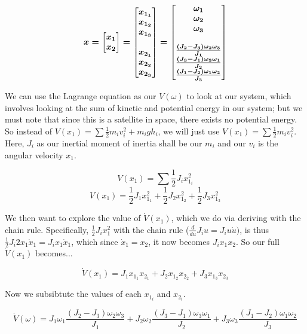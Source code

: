 \documentclass{article}
\begin{document}
\[ \boldmath{x} = \begin{bmatrix}
    x_1 \\ x_2
\end{bmatrix} = \begin{bmatrix}
    x_{1_1} \\
    x_{1_2} \\ 
    x_{1_3} \\
    \\
    x_{2_1} \\
    x_{2_2} \\
    x_{2_3} 
\end{bmatrix} =
\begin{bmatrix}
    \omega_1 \\
    \omega_2 \\
    \omega_3 \\
    \\ 
    \frac{(J_2 - J_3)\omega_2 \omega_3}{J_1} \\
    \frac{(J_3 - J_1)\omega_3 \omega_1}{J_2} \\
    \frac{(J_1 - J_2)\omega_1 \omega_2}{J_3}
\end{bmatrix}\]

We can use the Lagrange equation as our $V(\omega)$ to look at our system, which involves looking at the sum of kinetic and potential energy in our system; but we must note that since this is a satellite in space, there exists no potential energy. So instead of  $V(x_1) = \sum{\frac{1}{2}m_iv_i^2+m_igh_i}$, we will just use $V(x_1) = \sum{\frac{1}{2}m_iv_i^2}$. Here, $J_i$ as our inertial moment of inertia shall be our $m_i$ and our $v_i$ is the angular velocity $x_1$.

\[ V(x_1) = \sum{\frac{1}{2} J_i x_{1_i}^2} \]
\[ V(x_1) = \frac{1}{2} J_1 x_{1_1}^2 + \frac{1}{2} J_2 x_{1_2}^2 + \frac{1}{2} J_3 x_{1_3}^2 \]

We then want to explore the value of $\dot{V}(x_1)$, which we do via deriving with the chain rule. Specifically, $\frac{1}{2}J_i x_1^2$ with the chain rule ($\frac{d}{du}J_i u = J_i u \dot{u})$, is thus $\frac{1}{2} J_i 2 x_1 \dot{x}_1 = J_i x_1 \dot{x}_1$, which since $\dot{x}_1 = x_2$, it now becomes $J_i x_1 x_2$. So our full $\dot{V}(x_1)$ becomes...

\[ \dot{V}(x_1) = J_1 x_{1_1} x_{2_1} + J_2 x_{1_2} x_{2_2} + J_3 x_{1_3} x_{2_3}\]

Now we subsibtute the values of each $x_{1_i}$ and $x_{2_i}$.

\[ \dot{V}(\omega) = J_1 \omega_1 \frac{(J_2 - J_3)\omega_2 \omega_3}{J_1} + J_2 \omega_2 \frac{(J_3 - J_1)\omega_3 \omega_1}{J_2} + J_3 \omega_3 \frac{(J_1 - J_2)\omega_1 \omega_2}{J_3}\]
\end{document}
